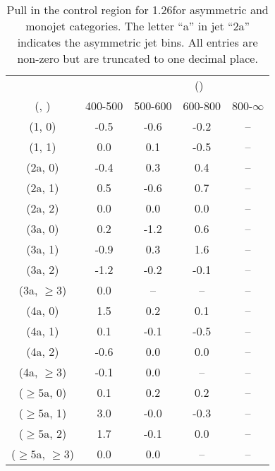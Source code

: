 \begin{table}[h!]
\tiny
\centering
\caption{Pull in the \gj control region for 1.26\ifb for asymmetric and monojet categories. The letter ``a'' in jet \eg ``2a''  indicates the asymmetric jet bins. All entries are non-zero but are truncated to one decimal place.\label{tab:pullsep_gj_ewk_asym}}
\begin{tabular}
{ccccc}
	\hline\hline
&	& \multicolumn{4}{c}{\scalht (\gev)} \\ 
	 (\njet,  \nb) & 400-500 & 500-600 & 600-800 & 800-$\infty$ \\ [0.8ex] 
\hline
	(1, 0) & -0.5 & -0.6 & -0.2 & -- \\[0.5ex] 
	(1, 1) & 0.0 & 0.1 & -0.5 & -- \\[0.5ex] 
	(2a, 0) & -0.4 & 0.3 & 0.4 & -- \\[0.5ex] 
	(2a, 1) & 0.5 & -0.6 & 0.7 & -- \\[0.5ex] 
	(2a, 2) & 0.0 & 0.0 & 0.0 & -- \\[0.5ex] 
	(3a, 0) & 0.2 & -1.2 & 0.6 & -- \\[0.5ex] 
	(3a, 1) & -0.9 & 0.3 & 1.6 & -- \\[0.5ex] 
	(3a, 2) & -1.2 & -0.2 & -0.1 & -- \\[0.5ex] 
	(3a, $\ge3$) & 0.0 & -- & -- & -- \\[0.5ex] 
	(4a, 0) & 1.5 & 0.2 & 0.1 & -- \\[0.5ex] 
	(4a, 1) & 0.1 & -0.1 & -0.5 & -- \\[0.5ex] 
	(4a, 2) & -0.6 & 0.0 & 0.0 & -- \\[0.5ex] 
	(4a, $\ge3$) & -0.1 & 0.0 & -- & -- \\[0.5ex] 
	($\ge5$a, 0) & 0.1 & 0.2 & 0.2 & -- \\[0.5ex] 
	($\ge5$a, 1) & 3.0 & -0.0 & -0.3 & -- \\[0.5ex] 
	($\ge5$a, 2) & 1.7 & -0.1 & 0.0 & -- \\[0.5ex] 
	($\ge5$a, $\ge3$) & 0.0 & 0.0 & -- & -- \\[0.5ex] 
	\hline
	\hline
\end{tabular}
\end{table}
